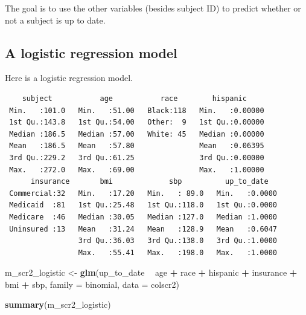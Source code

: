 \documentclass[]{book}
\newenvironment{Shaded}{\begin{snugshade}}{\end{snugshade}}
\newcommand{\KeywordTok}[1]{\textcolor[rgb]{0.13,0.29,0.53}{\textbf{#1}}}
\newcommand{\DataTypeTok}[1]{\textcolor[rgb]{0.13,0.29,0.53}{#1}}
\newcommand{\StringTok}[1]{\textcolor[rgb]{0.31,0.60,0.02}{#1}}
\newcommand{\OperatorTok}[1]{\textcolor[rgb]{0.81,0.36,0.00}{\textbf{#1}}}
\newcommand{\NormalTok}[1]{#1}
\theoremstyle{definition}
\theoremstyle{definition}
\theoremstyle{definition}
\theoremstyle{remark}
\begin{document}
The goal is to use the other variables (besides subject ID) to predict
whether or not a subject is up to date.

\subsection{A logistic regression
model}\label{a-logistic-regression-model}

Here is a logistic regression model.

\begin{Shaded}
\end{Shaded}

\begin{verbatim}
    subject           age           race        hispanic      
 Min.   :101.0   Min.   :51.00   Black:118   Min.   :0.00000  
 1st Qu.:143.8   1st Qu.:54.00   Other:  9   1st Qu.:0.00000  
 Median :186.5   Median :57.00   White: 45   Median :0.00000  
 Mean   :186.5   Mean   :57.80               Mean   :0.06395  
 3rd Qu.:229.2   3rd Qu.:61.25               3rd Qu.:0.00000  
 Max.   :272.0   Max.   :69.00               Max.   :1.00000  
      insurance       bmi             sbp          up_to_date    
 Commercial:32   Min.   :17.20   Min.   : 89.0   Min.   :0.0000  
 Medicaid  :81   1st Qu.:25.48   1st Qu.:118.0   1st Qu.:0.0000  
 Medicare  :46   Median :30.05   Median :127.0   Median :1.0000  
 Uninsured :13   Mean   :31.24   Mean   :128.9   Mean   :0.6047  
                 3rd Qu.:36.03   3rd Qu.:138.0   3rd Qu.:1.0000  
                 Max.   :55.41   Max.   :198.0   Max.   :1.0000  
\end{verbatim}

\begin{Shaded}
\begin{Highlighting}[]
\NormalTok{m_scr2_logistic <-}\StringTok{ }\KeywordTok{glm}\NormalTok{(up_to_date }\OperatorTok{~}\StringTok{ }\NormalTok{age }\OperatorTok{+}\StringTok{ }\NormalTok{race }\OperatorTok{+}\StringTok{ }\NormalTok{hispanic }\OperatorTok{+}\StringTok{ }
\StringTok{                    }\NormalTok{insurance }\OperatorTok{+}\StringTok{ }\NormalTok{bmi }\OperatorTok{+}\StringTok{ }\NormalTok{sbp, }
                \DataTypeTok{family =}\NormalTok{ binomial, }\DataTypeTok{data =}\NormalTok{ colscr2)}

\KeywordTok{summary}\NormalTok{(m_scr2_logistic)}
\end{Highlighting}
\end{Shaded}
\end{document}
